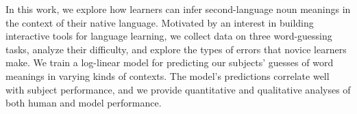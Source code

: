 In this work, we explore how learners can infer second-language noun meanings in the context of their native language. Motivated by an interest in building interactive tools for language learning, we collect data on three word-guessing tasks, analyze their difficulty, and explore the types of errors that novice learners make. We train a log-linear model for predicting our subjects' guesses of word meanings in varying kinds of contexts. The model's predictions correlate well with subject performance, and we provide quantitative and qualitative analyses of both human and model performance.

